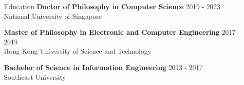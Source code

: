 \begin{rSection}{Education}
{\bf Doctor of Philosophy in Computer Science} \hfill {2019 - 2023}\\
National University of Singapore

{\bf Master of Philosophy in Electronic and Computer Engineering} \hfill {2017 - 2019}\\
Hong Kong University of Science and Technology

{\bf Bachelor of Science in Information Engineering} \hfill {2013 - 2017}\\
Southeast University

\end{rSection}
